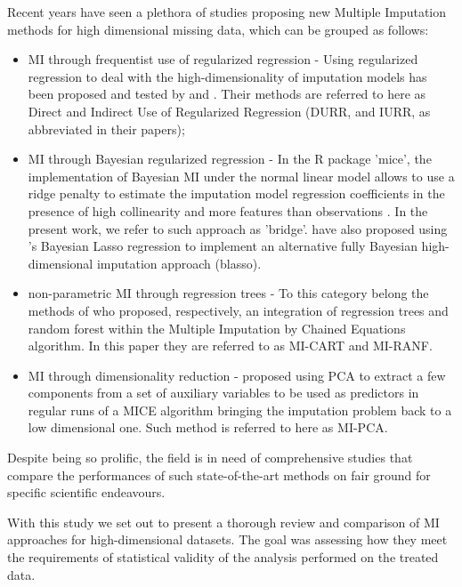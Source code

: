 Recent years have seen a plethora of studies proposing new Multiple Imputation methods for high dimensional
missing data, which can be grouped as follows: 
\begin{itemize}
\item MI through frequentist use of regularized regression - Using regularized regression to
	deal with the high-dimensionality of imputation models has been proposed and tested by
	\citet{zhaoLong:2016} and \citet{dengEtAl:2016}. Their methods are referred to here 
	as Direct and Indirect Use of Regularized Regression (DURR, and IURR, as abbreviated in their papers);
\item MI through Bayesian regularized regression - In the R package 'mice', the implementation of 
	Bayesian MI under the normal linear model allows to use a ridge penalty to estimate the imputation 
	model regression coefficients in the presence of high collinearity and more features than observations
	\citep[p. 68, algotithm 3.1]{vanBuuren:2012}. In the present work, we refer to such approach as 'bridge'. 
	\citet{zhaoLong:2016} have also proposed using \citet{hans:2009}'s Bayesian Lasso regression to implement an 
	alternative fully Bayesian high-dimensional imputation approach (blasso).
\item non-parametric MI through regression trees - To this category belong the methods of 
	\citet{burgetteReiter:2010, shahEtAl:2014} who proposed, respectively, an integration of regression trees 
	and random forest within the Multiple Imputation by Chained Equations algorithm. In this paper they are 
	referred to as MI-CART and MI-RANF.
\item MI through dimensionality reduction - \citet{howardEtAl:2015} proposed using PCA to extract a few components
	from a set of auxiliary variables to be used as predictors in regular runs of a MICE algorithm bringing the 
	imputation problem back to a low dimensional one. Such method is referred to here as MI-PCA.
\end{itemize}
Despite being so prolific, the field is in need of comprehensive studies that compare the performances
of such state-of-the-art methods on fair ground for specific scientific endeavours.

With this study we set out to present a thorough review and comparison of MI approaches for high-dimensional 
datasets. The goal was assessing how they meet the requirements of statistical validity of the analysis 
performed on the treated data.

